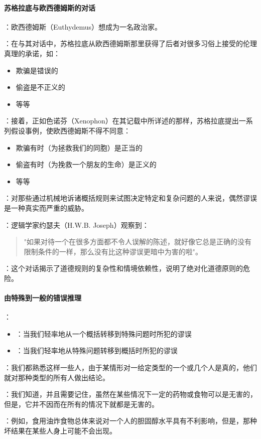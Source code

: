 \paragraph{苏格拉底与欧西德姆斯的对话}
\begin{examplebox}[title=苏格拉底与欧西德姆斯的对话]
：欧西德姆斯（Euthydemus）想成为一名政治家。

：在与其对话中，苏格拉底从欧西德姆斯那里获得了后者对很多习俗上接受的伦理真理的承诺，如：
\begin{itemize}
  \item 欺骗是错误的
  \item 偷盗是不正义的
  \item 等等
\end{itemize}

：接着，正如色诺芬（Xenophon）在其记载中所详述的那样，苏格拉底提出一系列假设事例，使欧西德姆斯不得不同意：
\begin{itemize}
  \item 欺骗有时（为拯救我们的同胞）是正当的
  \item 偷盗有时（为挽救一个朋友的生命）是正义的
  \item 等等
\end{itemize}

：对那些通过机械地诉诸概括规则来试图决定特定和复杂问题的人来说，偶然谬误是一种真实而严重的威胁。

：逻辑学家约瑟夫（H.W.B. Joseph）观察到：

\begin{quote}
"如果对待一个在很多方面都不令人误解的陈述，就好像它总是正确的没有限制条件的一样，那么没有比这种谬误更暗中为害的啦"。
\end{quote}

：这个对话揭示了道德规则的复杂性和情境依赖性，说明了绝对化道德原则的危险。
\end{examplebox}

\paragraph{由特殊到一般的错误推理}
\begin{theorembox}[title=由特殊到一般的错误推理]
：
\begin{itemize}
  \item {}：当我们轻率地从一个概括转移到特殊问题时所犯的谬误
  \item {}：当我们轻率地从特殊问题转移到概括时所犯的谬误
\end{itemize}

：我们都熟悉这样一些人，由于某情形对一给定类型的一个或几个人是真的，他们就对那种类型的所有人做出结论。

：我们知道，并且需要记住，虽然在某些情况下一定的药物或食物可以是无害的，但是，它并不因而在所有的情况下就都是无害的。

：例如，食用油炸食物总体来说对一个人的胆固醇水平具有不利影响，但是，那种坏结果在某些人身上可能不会出现。
\end{theorembox}

